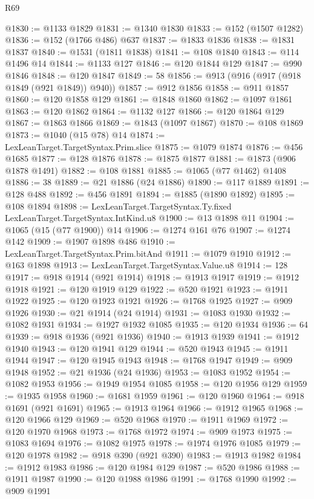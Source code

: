 \begin{lexlean}{R69}
\begin{coremodule}
@1830 := @1133 @1829
@1831 := @1340 @1830
@1833 := @152 (@1507 @1282)
@1836 := @152 (@1766 @486) @637
@1837 := @1833 @1836
@1838 := @1831 @1837
@1840 := @1531 (@1811 @1838)
@1841 := @108 @1840
@1843 := @114 @1496 @14
@1844 := @1133 @127
@1846 := @120 @1844 @129
@1847 := @990 @1846
@1848 := @120 @1847
@1849 := 58
@1856 := @913 (@916 (@917 (@918 @1849 (@921 @1849)) @940))
@1857 := @912 @1856
@1858 := @911 @1857
@1860 := @120 @1858 @129
@1861 := @1848 @1860
@1862 := @1097 @1861
@1863 := @120 @1862
@1864 := @1132 @127
@1866 := @120 @1864 @129
@1867 := @1863 @1866
@1869 := @1843 (@1097 @1867)
@1870 := @108 @1869
@1873 := @1040 (@15 @78) @14
@1874 := LexLeanTarget.TargetSyntax.Prim.slice
@1875 := @1079 @1874
@1876 := @456 @1685
@1877 := @128 @1876
@1878 := @1875 @1877
@1881 := @1873 (@906 @1878 @1491)
@1882 := @108 @1881
@1885 := @1065 (@77 @1462) @1408
@1886 := 38
@1889 := @21 @1886 (@24 @1886)
@1890 := @117 @1889
@1891 := @128 @488
@1892 := @456 @1891
@1894 := @1885 (@1890 @1892)
@1895 := @108 @1894
@1898 := LexLeanTarget.TargetSyntax.Ty.fixed LexLeanTarget.TargetSyntax.IntKind.u8
@1900 := @13 @1898 @11
@1904 := @1065 (@15 (@77 @1900)) @14
@1906 := @1274 @161 @76
@1907 := @1274 @142
@1909 := @1907 @1898 @486
@1910 := LexLeanTarget.TargetSyntax.Prim.bitAnd
@1911 := @1079 @1910
@1912 := @163 @1898
@1913 := LexLeanTarget.TargetSyntax.Value.u8
@1914 := 128
@1917 := @918 @1914 (@921 @1914)
@1918 := @1913 @1917
@1919 := @1912 @1918
@1921 := @120 @1919 @129
@1922 := @520 @1921
@1923 := @1911 @1922
@1925 := @120 @1923 @1921
@1926 := @1768 @1925
@1927 := @909 @1926
@1930 := @21 @1914 (@24 @1914)
@1931 := @1083 @1930
@1932 := @1082 @1931
@1934 := @1927 @1932 @1085
@1935 := @120 @1934
@1936 := 64
@1939 := @918 @1936 (@921 @1936)
@1940 := @1913 @1939
@1941 := @1912 @1940
@1943 := @120 @1941 @129
@1944 := @520 @1943
@1945 := @1911 @1944
@1947 := @120 @1945 @1943
@1948 := @1768 @1947
@1949 := @909 @1948
@1952 := @21 @1936 (@24 @1936)
@1953 := @1083 @1952
@1954 := @1082 @1953
@1956 := @1949 @1954 @1085
@1958 := @120 @1956 @129
@1959 := @1935 @1958
@1960 := @1681 @1959
@1961 := @120 @1960
@1964 := @918 @1691 (@921 @1691)
@1965 := @1913 @1964
@1966 := @1912 @1965
@1968 := @120 @1966 @129
@1969 := @520 @1968
@1970 := @1911 @1969
@1972 := @120 @1970 @1968
@1973 := @1768 @1972
@1974 := @909 @1973
@1975 := @1083 @1694
@1976 := @1082 @1975
@1978 := @1974 @1976 @1085
@1979 := @120 @1978
@1982 := @918 @390 (@921 @390)
@1983 := @1913 @1982
@1984 := @1912 @1983
@1986 := @120 @1984 @129
@1987 := @520 @1986
@1988 := @1911 @1987
@1990 := @120 @1988 @1986
@1991 := @1768 @1990
@1992 := @909 @1991

\end{coremodule}
\end{lexlean}
